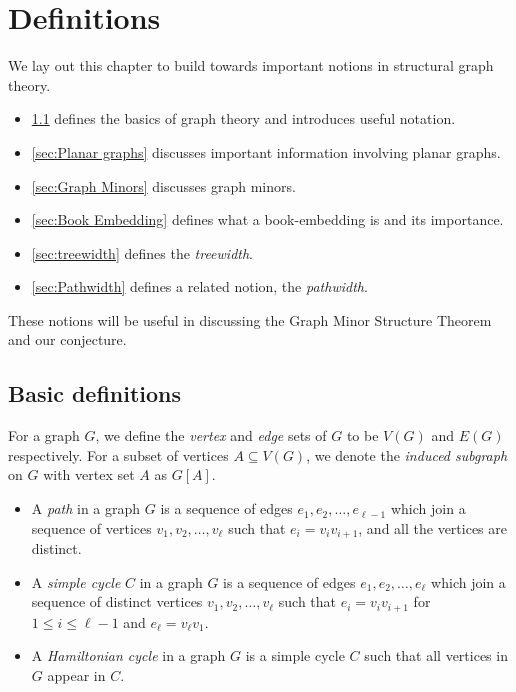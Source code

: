 \chapter{Definitions}\label{chap:Definitions}
We lay out this chapter to build towards important notions in structural graph theory.
\begin{itemize}
	\item \cref{sec: Basic definitions} defines the basics of graph theory and introduces useful notation.
	\item \cref{sec:Planar graphs} discusses important information involving planar graphs. 
	\item \cref{sec:Graph Minors} discusses graph minors.
	\item \cref{sec:Book Embedding} defines what a book-embedding is and its importance. 
	\item \cref{sec:treewidth} defines the \textit{treewidth}.
	\item \cref{sec:Pathwidth} defines a related notion, the \textit{pathwidth}.
\end{itemize}
These notions will be useful in discussing the Graph Minor Structure Theorem and our conjecture. 
\section{Basic definitions}\label{sec: Basic definitions}
For a graph \(G\), we define the \textit{vertex} and \textit{edge} sets of \(G\) to be \(V(G)\) and \(E(G)\) respectively.
For a subset of vertices \(A \subseteq V(G)\), we denote the \textit{induced subgraph} on \(G\) with vertex set \(A\) as \(G[A]\). 

\begin{itemize}
	\item A \textit{path} in a graph \(G\) is a sequence of edges \(e_1, e_2, \ldots, e_{\ell- 1}\) which join a sequence of vertices \(v_1, v_2, \ldots, v_{\ell}\) such that \(e_i = v_i v_{i + 1}\), and all the vertices are distinct. 
	\item A \textit{simple cycle} \(C\) in a graph \(G\) is a sequence of edges \(e_1, e_2, \ldots, e_{\ell}\) which join a sequence of distinct vertices \(v_1, v_2, \ldots, v_{\ell}\) such that \(e_i = v_i v_{i + 1}\) for \(1 \leq i \leq \ell - 1\) and \(e_\ell = v_\ell v_1\). 
	\item A \textit{Hamiltonian cycle} in a graph \(G\) is a simple cycle \(C\) such that all vertices in \(G\) appear in \(C\).
\end{itemize}

